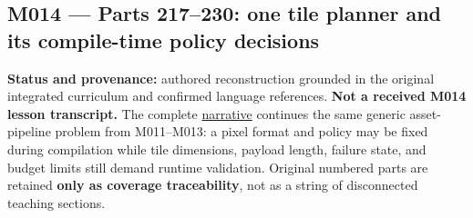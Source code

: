 \subsection{M014 --- Parts 217--230: one tile planner and its compile-time policy decisions}\label{m014-parts-217230-one-tile-planner-and-its-compile-time-policy-decisions}

\textbf{Status and provenance:} authored reconstruction grounded in the original integrated curriculum and confirmed language references. \textbf{Not a received M014 lesson transcript.} The complete \href{Continuous\%20Notes/Computing\%20Foundations\%20-\%20From\%20Bits\%20to\%20C++\%20and\%20Systems\%20APIs\#A\%20texture\%20tile\%20that\%20chooses\%20its\%20work\%20before\%20the\%20frame\%20begins}{narrative} continues the same generic asset-pipeline problem from M011--M013: a pixel format and policy may be fixed during compilation while tile dimensions, payload length, failure state, and budget limits still demand runtime validation. Original numbered parts are retained \textbf{only as coverage traceability}, not as a string of disconnected teaching sections.

